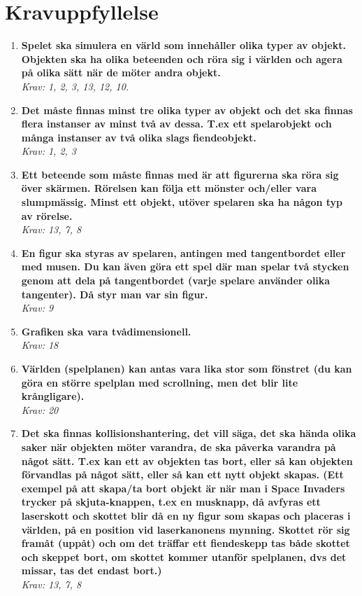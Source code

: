\documentclass[12pt]{TDP005mall}
\begin{document}
\section{Kravuppfyllelse}
\begin{enumerate}
    \item \textbf{Spelet ska simulera en värld som innehåller olika typer av objekt. Objekten ska ha olika beteenden och röra sig i världen och agera på olika sätt när de möter andra objekt.} \\ \emph{Krav: 1, 2, 3, 13, 12, 10.}
    
    \item \textbf{Det måste finnas minst tre olika typer av objekt och det ska finnas flera instanser av minst två av dessa. T.ex ett spelarobjekt och många instanser av två olika slags fiendeobjekt.} \\ \emph{Krav: 1, 2, 3}
    
    \item \textbf{Ett beteende som måste finnas med är att figurerna ska röra sig över skärmen. Rörelsen kan följa ett mönster och/eller vara slumpmässig. Minst ett objekt, utöver spelaren ska ha någon typ av rörelse.} \\ \emph{Krav: 13, 7, 8}
    
    \item \textbf{En figur ska styras av spelaren, antingen med tangentbordet eller med musen. Du kan även göra ett spel där man spelar två stycken genom att dela på tangentbordet (varje spelare använder olika tangenter). Då styr man var sin figur.} \\ \emph{Krav: 9}
    
    \item \textbf{Grafiken ska vara tvådimensionell.} \\ \emph{Krav: 18}
    
    \item \textbf{Världen (spelplanen) kan antas vara lika stor som fönstret (du kan göra en större spelplan med scrollning, men det blir lite krångligare).} \\ \emph{Krav: 20}
    
    \item \textbf{Det ska finnas kollisionshantering, det vill säga, det ska hända olika saker när objekten möter varandra, de ska påverka varandra på något sätt. T.ex kan ett av objekten tas bort, eller så kan objekten förvandlas på något sätt, eller så kan ett nytt objekt skapas. (Ett exempel på att skapa/ta bort objekt är när man i Space Invaders trycker på skjuta-knappen, t.ex en musknapp, då avfyras ett laserskott och skottet blir då en ny figur som skapas och placeras i världen, på en position vid laserkanonens mynning. Skottet rör sig framåt (uppåt) och om det träffar ett fiendeskepp tas både skottet och skeppet bort, om skottet kommer utanför spelplanen, dvs det missar, tas det endast bort.)} \\ \emph{Krav: 13, 7, 8}
    

\end{enumerate}
\end{document}

